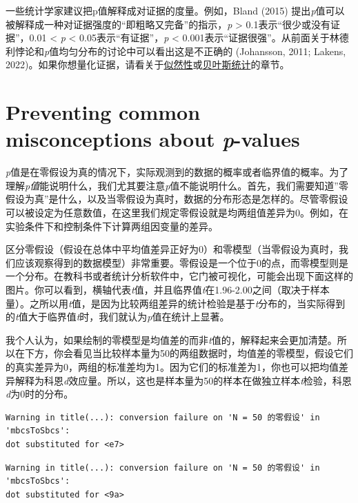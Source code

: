 \documentclass[
  letterpaper,
  DIV=11,
  numbers=noendperiod]{scrreprt}
\begin{document}
一些统计学家建议把p值解释成对证据的度量。例如，Bland (2015)
提出\emph{p}值可以被解释成一种对证据强度的``即粗略又完备''的指示，\emph{p}
\textgreater{} 0.1表示``很少或没有证据''，0.01 \textless{} \emph{p}
\textless{} 0.05表示``有证据''，\emph{p} \textless{}
0.001表示``证据很强''。从前面关于林德利悖论和\emph{p}值均匀分布的讨论中可以看出这是不正确的
(Johansson, 2011; Lakens,
2022)。如果你想量化证据，请看关于\protect\hyperlink{likelihoods}{似然性}或\protect\hyperlink{bayes}{贝叶斯统计}的章节。

\hypertarget{sec-misconceptions}{%
\section{\texorpdfstring{Preventing common misconceptions about
\emph{p}-values}{Preventing common misconceptions about p-values}}\label{sec-misconceptions}}

\emph{p}值是在零假设为真的情况下，实际观测到的数据的概率或者临界值的概率。为了理解\emph{p值}能说明什么，我们尤其要注意\emph{p}值不能说明什么。首先，我们需要知道''零假设为真''是什么，以及当零假设为真时，数据的分布形态是怎样的。尽管零假设可以被设定为任意数值，在这里我们规定零假设就是均两组值差异为0。例如，在实验条件下和控制条件下计算两组因变量的差异。

区分零假设（假设在总体中平均值差异正好为0）和零模型（当零假设为真时，我们应该观察得到的数据模型）非常重要。零假设是一个位于0的点，而零模型则是一个分布。在教科书或者统计分析软件中，它门被可视化，可能会出现下面这样的图片。你可以看到，横轴代表\emph{t}值，并且临界值\emph{t}在1.96-2.00之间（取决于样本量）。之所以用\emph{t}值，是因为比较两组差异的统计检验是基于\emph{t}分布的，当实际得到的\emph{t}值大于临界值\emph{t}时，我们就认为\emph{p}值在统计上显著。

我个人认为，如果绘制的零模型是均值差的而非\emph{t}值的，解释起来会更加清楚。所以在下方，你会看见当比较样本量为50的两组数据时，均值差的零模型，假设它们的真实差异为0，两组的标准差均为1。因为它们的标准差为1，你也可以把均值差异解释为科恩\emph{d}效应量。所以，这也是样本量为50的样本在做独立样本\emph{t}检验，科恩\emph{d}为0时的分布。

\begin{verbatim}
Warning in title(...): conversion failure on 'N = 50 的零假设' in 'mbcsToSbcs':
dot substituted for <e7>
\end{verbatim}

\begin{verbatim}
Warning in title(...): conversion failure on 'N = 50 的零假设' in 'mbcsToSbcs':
dot substituted for <9a>
\end{verbatim}
\end{document}
